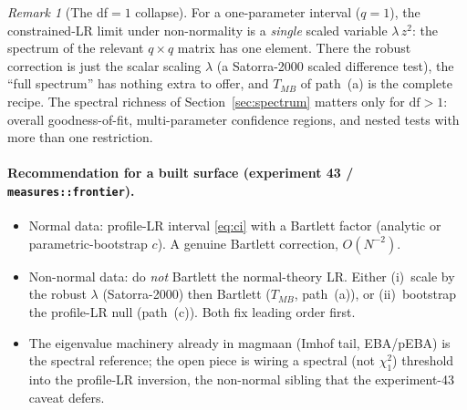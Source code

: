 \documentclass[11pt]{article}
\theoremstyle{plain}
\theoremstyle{remark}
\newtheorem*{remark}{Remark}
\begin{document}
\begin{remark}[The df${=}1$ collapse]
For a one-parameter interval ($q = 1$), the constrained-LR limit under
non-normality is a \emph{single} scaled variable $\lambda\, z^2$: the spectrum of
the relevant $q\times q$ matrix has one element. There the robust correction is
just the scalar scaling $\lambda$ (a Satorra-2000 scaled difference test), the
``full spectrum'' has nothing extra to offer, and $T_{MB}$ of path~(a) is the
complete recipe. The spectral richness of Section~\ref{sec:spectrum} matters only
for $\mathrm{df}>1$: overall goodness-of-fit, multi-parameter confidence regions,
and nested tests with more than one restriction.
\end{remark}

\paragraph{Recommendation for a built surface (experiment 43 /
\texttt{measures::frontier}).}
\begin{itemize}
\item Normal data: profile-LR interval \eqref{eq:ci} with a Bartlett factor
(analytic or parametric-bootstrap $c$). A genuine Bartlett correction, $O(N^{-2})$.
\item Non-normal data: do \emph{not} Bartlett the normal-theory LR. Either
(i)~scale by the robust $\lambda$ (Satorra-2000) then Bartlett ($T_{MB}$,
path~(a)), or (ii)~bootstrap the profile-LR null (path~(c)). Both fix leading
order first.
\item The eigenvalue machinery already in magmaan (Imhof tail, EBA/pEBA) is the
spectral reference; the open piece is wiring a spectral (not $\chi^2_1$) threshold
into the profile-LR inversion, the non-normal sibling that the experiment-43
caveat defers.
\end{itemize}
\end{document}
